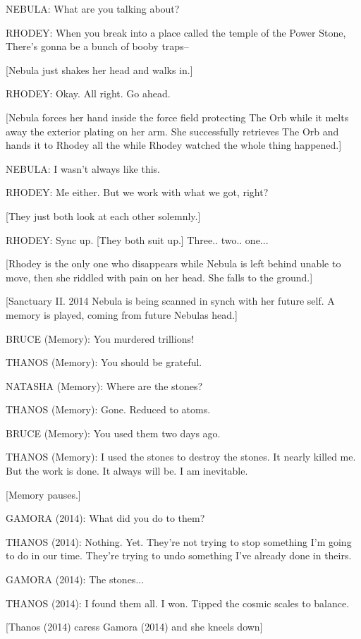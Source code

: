 NEBULA: What are you talking about?

RHODEY: When you break into a place called the temple of the Power Stone, There's gonna be a bunch of booby traps–

[Nebula just shakes her head and walks in.]

RHODEY: Okay. All right. Go ahead.

[Nebula forces her hand inside the force field protecting The Orb while it melts away the exterior plating on her arm. She successfully retrieves The Orb and hands it to Rhodey all the while Rhodey watched the whole thing happened.]

NEBULA: I wasn't always like this.

RHODEY: Me either. But we work with what we got, right?

[They just both look at each other solemnly.]

RHODEY: Sync up. [They both suit up.] Three.. two.. one...

[Rhodey is the only one who disappears while Nebula is left behind unable to move, then she riddled with pain on her head. She falls to the ground.]

[Sanctuary II. 2014 Nebula is being scanned in synch with her future self. A memory is played, coming from future Nebulas head.]

BRUCE (Memory): You murdered trillions!

THANOS (Memory): You should be grateful.

NATASHA (Memory): Where are the stones?

THANOS (Memory): Gone. Reduced to atoms.

BRUCE (Memory): You used them two days ago.

THANOS (Memory): I used the stones to destroy the stones. It nearly killed me. But the work is done. It always will be. I am inevitable.

[Memory pauses.]

GAMORA (2014): What did you do to them?

THANOS (2014): Nothing. Yet. They're not trying to stop something I'm going to do in our time. They're trying to undo something I've already done in theirs.

GAMORA (2014): The stones...

THANOS (2014): I found them all. I won. Tipped the cosmic scales to balance.

[Thanos (2014) caress Gamora (2014) and she kneels down]

